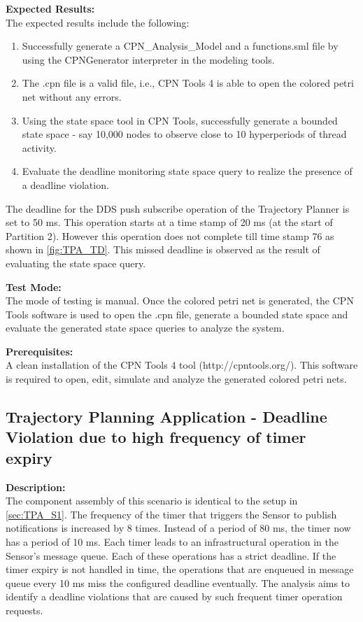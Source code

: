\noindent\textbf{Expected Results:}\\

The expected results include the following: 
\begin{enumerate}
\item Successfully generate a CPN\_Analysis\_Model and a functions.sml file by using the CPNGenerator interpreter in the modeling tools.
\item The .cpn file is a valid file, i.e., CPN Tools 4 is able to open the colored petri net without any errors.
\item Using the state space tool in CPN Tools, successfully generate a bounded state space - say 10,000 nodes to observe close to 10 hyperperiods of thread activity.
\item Evaluate the deadline monitoring state space query to realize the presence of a deadline violation.
\end{enumerate}
The deadline for the DDS push subscribe operation of the Trajectory Planner is set to 50 ms. This operation starts at a time stamp of 20 ms (at the start of Partition 2). However this operation does not complete till time stamp 76 as shown in \ref{fig:TPA_TD}. This missed deadline is observed as the result of evaluating the state space query.

\noindent\textbf{Test Mode:}\\
The mode of testing is manual. Once the colored petri net is generated, the CPN Tools software is used to open the .cpn file, generate a bounded state space and evaluate the generated state space queries to analyze the system.

\noindent\textbf{Prerequisites:}\\
A clean installation of the CPN Tools 4 tool (http://cpntools.org/). This software is required to open, edit, simulate and analyze the generated colored petri nets. 


\subsection{Trajectory Planning Application - Deadline Violation due to high frequency of timer expiry}

\noindent\textbf{Description:}\\
The component assembly of this scenario is identical to the setup in \ref{sec:TPA_S1}. The frequency of the timer that triggers the Sensor to publish notifications is increased by 8 times. Instead of a period of 80 ms, the timer now has a period of 10 ms. Each timer leads to an infrastructural operation in the Sensor's message queue. Each of these operations has a strict deadline. If the timer expiry is not handled in time, the operations that are enqueued in message queue every 10 ms miss the configured deadline eventually. The analysis aims to identify a deadline violations that are caused by such frequent timer operation requests. 


